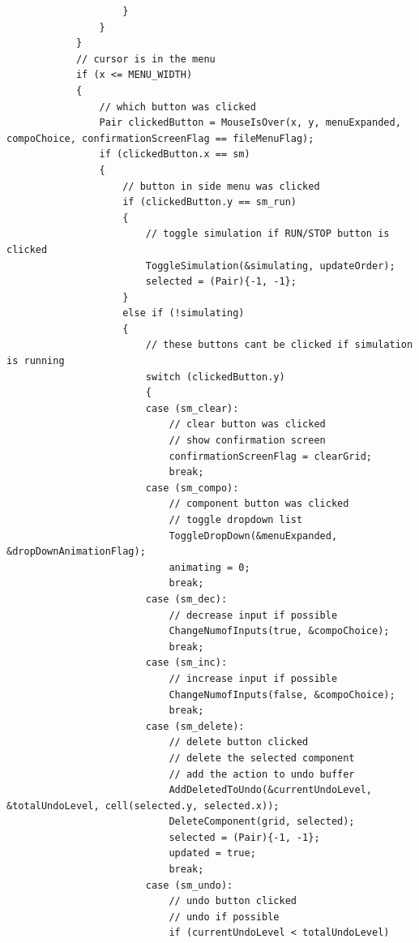 \documentclass[report]{subfiles}
\begin{document}
\begin{lstlisting}
                    }
                }
            }
            // cursor is in the menu
            if (x <= MENU_WIDTH)
            {
                // which button was clicked
                Pair clickedButton = MouseIsOver(x, y, menuExpanded, compoChoice, confirmationScreenFlag == fileMenuFlag);
                if (clickedButton.x == sm)
                {
                    // button in side menu was clicked
                    if (clickedButton.y == sm_run)
                    {
                        // toggle simulation if RUN/STOP button is clicked
                        ToggleSimulation(&simulating, updateOrder);
                        selected = (Pair){-1, -1};
                    }
                    else if (!simulating)
                    {
                        // these buttons cant be clicked if simulation is running
                        switch (clickedButton.y)
                        {
                        case (sm_clear):
                            // clear button was clicked
                            // show confirmation screen
                            confirmationScreenFlag = clearGrid;
                            break;
                        case (sm_compo):
                            // component button was clicked
                            // toggle dropdown list
                            ToggleDropDown(&menuExpanded, &dropDownAnimationFlag);
                            animating = 0;
                            break;
                        case (sm_dec):
                            // decrease input if possible
                            ChangeNumofInputs(true, &compoChoice);
                            break;
                        case (sm_inc):
                            // increase input if possible
                            ChangeNumofInputs(false, &compoChoice);
                            break;
                        case (sm_delete):
                            // delete button clicked
                            // delete the selected component
                            // add the action to undo buffer
                            AddDeletedToUndo(&currentUndoLevel, &totalUndoLevel, cell(selected.y, selected.x));
                            DeleteComponent(grid, selected);
                            selected = (Pair){-1, -1};
                            updated = true;
                            break;
                        case (sm_undo):
                            // undo button clicked
                            // undo if possible
                            if (currentUndoLevel < totalUndoLevel)

\end{lstlisting}
\end{document}
